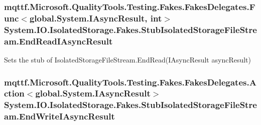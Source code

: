 \hypertarget{class_system_1_1_i_o_1_1_isolated_storage_1_1_fakes_1_1_stub_isolated_storage_file_stream_ae0169cd0d3b2c747d389ac990e66fb7a}{
\subsubsection[{End\-Read\-I\-Async\-Result}]{\setlength{\rightskip}{0pt plus 5cm}mqttf.\-Microsoft.\-Quality\-Tools.\-Testing.\-Fakes.\-Fakes\-Delegates.\-Func$<$global.\-System.\-I\-Async\-Result, int$>$ System.\-I\-O.\-Isolated\-Storage.\-Fakes.\-Stub\-Isolated\-Storage\-File\-Stream.\-End\-Read\-I\-Async\-Result}}\label{class_system_1_1_i_o_1_1_isolated_storage_1_1_fakes_1_1_stub_isolated_storage_file_stream_ae0169cd0d3b2c747d389ac990e66fb7a}


Sets the stub of Isolated\-Storage\-File\-Stream.\-End\-Read(\-I\-Async\-Result async\-Result)

\hypertarget{class_system_1_1_i_o_1_1_isolated_storage_1_1_fakes_1_1_stub_isolated_storage_file_stream_ae6834395e5ed5b284025fc7854b4eb73}{
\subsubsection[{End\-Write\-I\-Async\-Result}]{\setlength{\rightskip}{0pt plus 5cm}mqttf.\-Microsoft.\-Quality\-Tools.\-Testing.\-Fakes.\-Fakes\-Delegates.\-Action$<$global.\-System.\-I\-Async\-Result$>$ System.\-I\-O.\-Isolated\-Storage.\-Fakes.\-Stub\-Isolated\-Storage\-File\-Stream.\-End\-Write\-I\-Async\-Result}}\label{class_system_1_1_i_o_1_1_isolated_storage_1_1_fakes_1_1_stub_isolated_storage_file_stream_ae6834395e5ed5b284025fc7854b4eb73}


